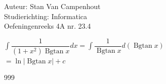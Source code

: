 \documentclass[a4paper]{article}
\begin{document}
  
\noindent \large Auteur: Stan Van Campenhout \\
\noindent \large Studierichting:  Informatica\\
\noindent \large Oefeningenreeks 4A nr. 23.4\\

\medskip

\normalsize

$ \displaystyle\int \dfrac{1}{\left(1 + x^2\right)\operatorname{Bgtan}x} dx
= \displaystyle\int \dfrac{1}{\operatorname{Bgtan}x} d\left(\operatorname{Bgtan}x\right) $\\

$ = \ln|\operatorname{Bgtan}x| + c $\\

\begin{thebibliography}{999}
\end{thebibliography}
\end{document}
